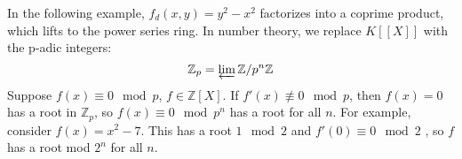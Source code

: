 \documentclass[11pt, oneside]{amsart}   	%
\theoremstyle{definition}
\begin{document}
\begin{itemize}
	In the following example, $f_d(x, y) = y^2 - x^2$ factorizes into a coprime product, which lifts to the power series ring. In number theory, we replace 
	$K[[X]]$ with the p-adic integers:
	$$
		\mathbb Z_p = \varprojlim \mathbb Z / p^n\mathbb Z
	$$
	Suppose $f(x)\equiv 0\mod p$, $f\in\mathbb Z[X]$. If $f'(x)\not\equiv 0\mod p$, then $f(x) = 0$ has a root in $\mathbb Z_p$, so $f(x)\equiv 0\mod p^n 
	$ has a root for all $n$. For example, consider $f(x) = x^2 - 7$. This has a root $1\mod 2$ and $f'(0)\equiv 0 \mod 2$ , so $f$ has a root mod $2^n$ 
	for all $n$. 

\end{itemize}
\end{document}
